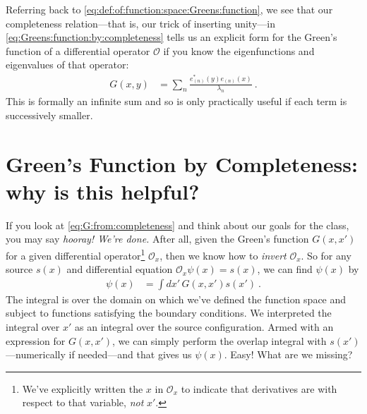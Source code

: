 \documentclass[
  11pt,
	colorful,
	raggedright,
]{tufte-style-thesis-flip}
\begin{document}
Referring back to \eqref{eq:def:of:function:space:Greens:function}, 
we see that our completeness relation---that is, our trick of inserting unity---in \eqref{eq:Greens:function:by:completeness} tells us an explicit form for the Green's function of a differential operator $\mathcal O$ if you know the eigenfunctions and eigenvalues of that operator:
\begin{align}
  G(x,y) &= \sum_n \frac{e_{(n)}^*(y) e_{(n)}(x)}{\lambda_n} \ .
  \label{eq:G:from:completeness}
\end{align}
This is formally an infinite sum and so is only practically useful if each term is successively smaller. 


\section{Green's Function by Completeness: why is this helpful?}
\label{sec:Greens:fuctions:by:completeness}

If you look at \eqref{eq:G:from:completeness} and think about our goals for the class, you may say \emph{hooray! We're done.} After all, given the Green's function $G(x,x')$ for a given differential operator\footnote{We've explicitly written the $x$ in $\mathcal O_x$ to indicate that derivatives are with respect to that variable, \emph{not} $x'$.} $\mathcal O_x$, then we know how to \emph{invert} $\mathcal O_x$. So for any source $s(x)$ and differential equation $\mathcal O_x \psi(x) = s(x)$, we can find $\psi(x)$ by
\begin{align}
  \psi(x) &= \int dx' \, G(x,x') s(x') \ .
\end{align}
The integral is over the domain on which we've defined the function space and subject to functions satisfying the boundary conditions. We interpreted the integral over $x'$ as an integral over the source configuration. Armed with an expression for $G(x,x')$, we can simply perform the overlap integral with $s(x')$---numerically if needed---and that gives us $\psi(x)$. Easy! What are we missing?
\end{document}
